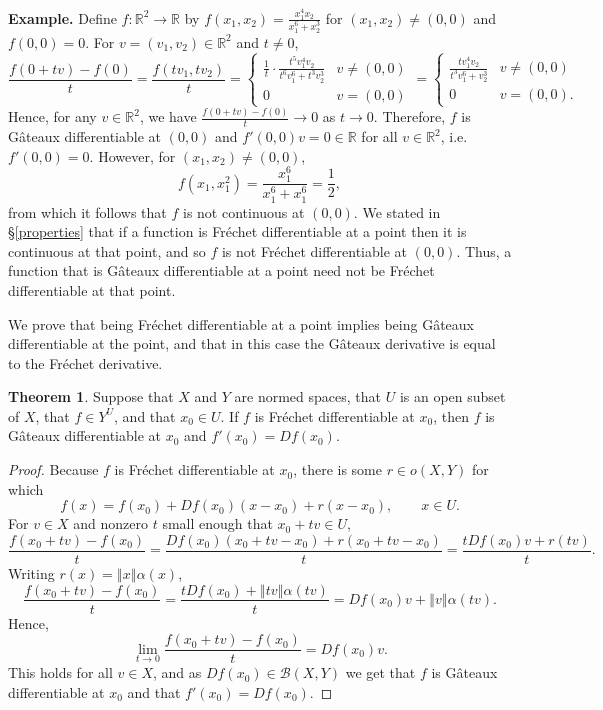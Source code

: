 \documentclass{article}
\newcommand{\norm}[1]{\left\Vert #1 \right\Vert}
\theoremstyle{definition}
\newtheorem{theorem}{Theorem}
\theoremstyle{definition}
\begin{document}
\textbf{Example.} Define $f:\mathbb{R}^2 \to \mathbb{R}$ by
$f(x_1,x_2)=\frac{x_1^4x_2}{x_1^6+x_2^3}$ for $(x_1,x_2) \neq (0,0)$ and
$f(0,0)=0$. For $v=(v_1,v_2) \in \mathbb{R}^2$ and $t \neq 0$,
\[
\frac{f(0+tv)-f(0)}{t}=\frac{f(tv_1,tv_2)}{t}=
\begin{cases}
\frac{1}{t} \cdot \frac{t^5v_1^4v_2}{t^6v_1^6+t^3v_2^3}&v \neq (0,0)\\
0&v=(0,0)
\end{cases}
=\begin{cases}
\frac{tv_1^4v_2}{t^3v_1^6+v_2^3}&v \neq (0,0)\\
0&v=(0,0).
\end{cases}
\]
Hence, for any $v \in \mathbb{R}^2$, we have $\frac{f(0+tv)-f(0)}{t} \to 0$ as $t \to 0$. Therefore, 
$f$ is G\^ateaux differentiable at $(0,0)$ and $f'(0,0)v = 0 \in \mathbb{R}$ for all $v \in \mathbb{R}^2$, i.e. $f'(0,0)=0$.
However, for $(x_1,x_2) \neq (0,0)$,
\[
f(x_1,x_1^2)=\frac{x_1^6}{x_1^6+x_1^6}=\frac{1}{2},
\]
from which it follows that $f$ is not continuous at $(0,0)$. We stated in \S \ref{properties} that if a function is Fr\'echet differentiable
at a point then it is continuous at that point, and so $f$ is not Fr\'echet differentiable at $(0,0)$. Thus, a function that is 
G\^ateaux differentiable at a point need not be Fr\'echet differentiable at that point.

We prove that being Fr\'echet differentiable at a point implies being G\^ateaux differentiable at the point, and that in this case the
G\^ateaux derivative is equal to the Fr\'echet derivative.

\begin{theorem}
Suppose that $X$ and $Y$ are normed spaces, that $U$ is an open subset of $X$, that $f \in Y^U$, and that
$x_0 \in U$. If $f$ is Fr\'echet differentiable at $x_0$, then $f$ is G\^ateaux differentiable at $x_0$ and $f'(x_0)=Df(x_0)$.
\end{theorem}
\begin{proof}
Because $f$ is Fr\'echet differentiable at $x_0$, there is some $r \in o(X,Y)$ for which 
\[
f(x)=f(x_0)+Df(x_0)(x-x_0)+r(x-x_0), \qquad x \in U.
\]
For $v \in X$ and nonzero $t$ small enough that $x_0+tv \in U$,
\[
\frac{f(x_0+tv)-f(x_0)}{t} = \frac{Df(x_0)(x_0+tv-x_0)+r(x_0+tv-x_0)}{t} = \frac{tDf(x_0)v+r(tv)}{t}.
\]
Writing $r(x)=\norm{x}\alpha(x)$,
\[
\frac{f(x_0+tv)-f(x_0)}{t}  = \frac{tDf(x_0)+\norm{tv}\alpha(tv)}{t}= Df(x_0)v + \norm{v}\alpha(tv).
\]
Hence, 
\[
\lim_{t \to 0} \frac{f(x_0+tv)-f(x_0)}{t} = Df(x_0)v.
\]
This holds for all $v \in X$, and as $Df(x_0) \in \mathscr{B}(X,Y)$ we get that $f$ is G\^ateaux differentiable at $x_0$ and that
$f'(x_0)=Df(x_0)$.
\end{proof}
\end{document}

